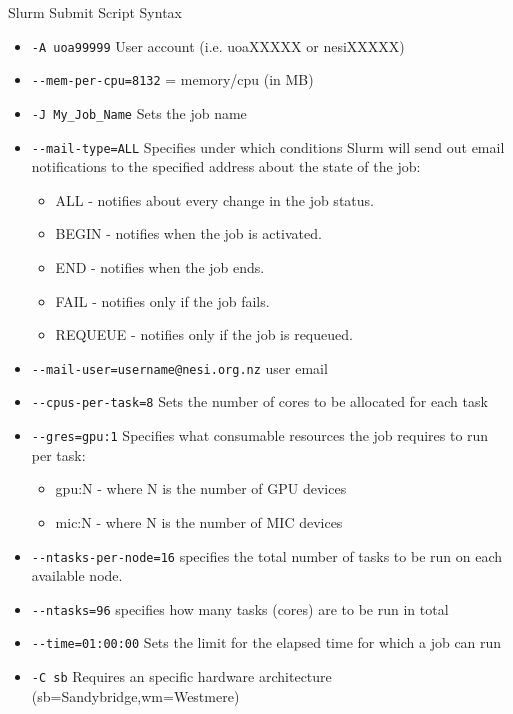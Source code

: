\documentclass[final,t]{beamer}
\begin{document}
\begin{frame}[fragile]{}
\begin{columns}[t]
\begin{column}{.35\linewidth}
      \begin{block}{Slurm Submit Script Syntax}
        \begin{itemize}
        \item \verb|-A uoa99999| User account (i.e. uoaXXXXX or nesiXXXXX)
        \item \verb|--mem-per-cpu=8132| = memory/cpu (in MB)
        \item \verb|-J My_Job_Name| Sets the job name
        \item \verb|--mail-type=ALL| Specifies under which conditions Slurm will send out email notifications to the specified address about the state of the job:
        \begin{itemize}
            \item ALL - notifies about every change in the job status.
            \item BEGIN - notifies when the job is activated.
            \item END - notifies when the job ends.
            \item FAIL - notifies only if the job fails.
            \item REQUEUE - notifies only if the job is requeued.
        \end{itemize}
        \item \verb|--mail-user=username@nesi.org.nz| user email
        \item \verb|--cpus-per-task=8| Sets the number of cores to be allocated for each task
        \item \verb|--gres=gpu:1| Specifies what consumable resources the job requires to run per task:
        \begin{itemize}
            \item gpu:N - where N is the number of GPU devices
            \item mic:N - where N is the number of MIC devices
        \end{itemize}
        \item \verb|--ntasks-per-node=16| specifies the total number of tasks to be run on each available node.
        \item \verb|--ntasks=96| specifies how many tasks (cores) are to be run in total
        \item \verb|--time=01:00:00| Sets the limit for the elapsed time for which a job can run
        \item \verb|-C sb| Requires an specific hardware architecture (sb=Sandybridge,wm=Westmere)
        \end{itemize}
      \end{block}


\end{column}
\end{columns}
\end{frame}
\end{document}
